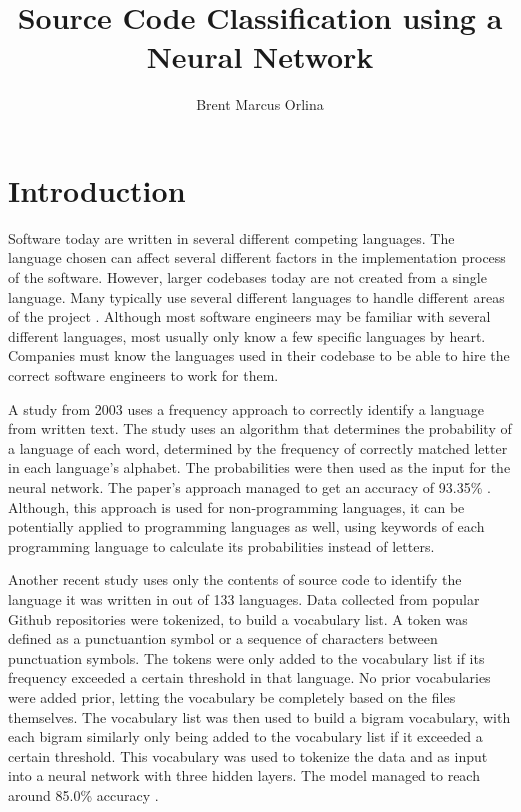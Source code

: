 \documentclass[acmlarge]{acmart}
\begin{document}
\title{Source Code Classification using a Neural Network}
\author{Brent Marcus Orlina}
\maketitle

\section{Introduction}
Software today are written in several different competing languages. The language chosen
can affect several different factors in the implementation process of the software. However,
larger codebases today are not created from a single language. Many typically use several
different languages to handle different areas of the project \cite{LyonsBaird2018}. Although most software engineers
may be familiar with several different languages, most usually only know a few specific
languages by heart. Companies must know the languages used in their codebase to be able to
hire the correct software engineers to work for them.

A study from 2003 uses a frequency approach to correctly identify a language from written
text. The study uses an algorithm that determines the probability of a language of each word,
determined by the frequency of correctly matched letter in each language's alphabet. The
probabilities were then used as the input for the neural network. The paper's approach managed
to get an accuracy of 93.35\% \cite{TianSuontausta2003}. Although, this approach is used for
non-programming languages, it can be potentially applied to programming languages as well,
using keywords of each programming language to calculate its probabilities instead of letters.

Another recent study uses only the contents of source code to identify the language it was
written in out of 133 languages. Data collected from popular Github repositories were tokenized,
to build a vocabulary list. A token was defined as a punctuantion symbol or a sequence of characters
between punctuation symbols. The tokens were only added to the vocabulary list if its frequency
exceeded a certain threshold in that language. No prior vocabularies were added prior, letting
the vocabulary be completely based on the files themselves. The vocabulary list was then used
to build a bigram vocabulary, with each bigram similarly only being added to the vocabulary list
if it exceeded a certain threshold. This vocabulary was used to tokenize the data and as input
into a neural network with three hidden layers. The model managed to reach around 85.0\% accuracy
\cite{BonifroStefano2021}.
\end{document}
